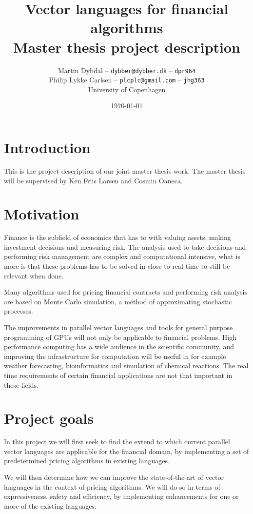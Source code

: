 \documentclass[10pt,a4paper,final,oneside,openany,article]{memoir}
\title{Vector languages for financial algorithms \\
      \small{Master thesis project description}
}
\author{
  Martin Dybdal -- \texttt{dybber@dybber.dk} -- \texttt{dpr964} \\
  Philip Lykke Carlsen -- \texttt{plcplc@gmail.com} -- \texttt{jhg363}
\\
University of Copenhagen}
\date{\today}
\begin{document}
\maketitle

\chapter{Introduction}
This is the project description of our joint master thesis work. The
master thesis will be supervised by Ken Friis Larsen and Cosmin
Oaneca.

\chapter{Motivation}
Finance is the subfield of economics that has to with valuing assets,
making investment decisions and measuring risk. The analysis used to
take decisions and performing risk management are complex and
computational intensive, what is more is that these problems has to be
solved in close to real time to still be relevant when done.

Many algorithms used for pricing financial contracts and performing
risk analysis are based on Monte Carlo simulation, a method of
approximating stochastic processes.


The improvements in parallel vector languages and tools for general
purpose programming of GPUs will not only be applicable to financial
problems. High performance computing has a wide audience in the
scientific community, and improving the infrastructure for computation
will be useful in for example weather forecasting, bioinformatics and
simulation of chemical reactions. The
real time requirements of certain financial applications are not that
important in these fields.


\chapter{Project goals}
In this project we will first seek to find the extend to which
current parallel vector languages are applicable for the financial
domain, by implementing a set of predetermined pricing algorithms in
existing languages.

We will then determine how we can improve the state-of-the-art of
vector languages in the context of pricing algorithms. We will do so
in terms of expressiveness, safety and efficiency, by implementing
enhancements for one or more of the existing languages.
\end{document}
